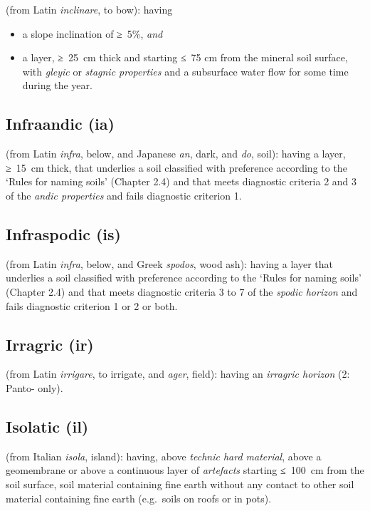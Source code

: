 \documentclass[
  letterpaper,
  DIV=11,
  numbers=noendperiod]{scrreprt}
\providecommand{\tightlist}{%
  \setlength{\itemsep}{0pt}\setlength{\parskip}{0pt}}\usepackage{longtable,booktabs,array}
\begin{document}
(from Latin \emph{inclinare}, to bow): having

\begin{itemize}
\tightlist
\item
  a slope inclination of ≥~5\%, \emph{and}
\item
  a layer, ≥~25~cm thick and starting ≤~75 cm from the mineral soil
  surface, with \emph{gleyic} or \emph{stagnic properties} and a
  subsurface water flow for some time during the year.
\end{itemize}

\hypertarget{infraandic-ia}{%
\subsection{Infraandic (ia)}\label{infraandic-ia}}

(from Latin \emph{infra}, below, and Japanese \emph{an}, dark, and
\emph{do}, soil): having a layer, ≥~15~cm thick, that underlies a soil
classified with preference according to the `Rules for naming soils'
(Chapter 2.4) and that meets diagnostic criteria 2 and 3 of the
\emph{andic properties} and fails diagnostic criterion 1.

\hypertarget{infraspodic-is}{%
\subsection{Infraspodic (is)}\label{infraspodic-is}}

(from Latin \emph{infra}, below, and Greek \emph{spodos}, wood ash):
having a layer that underlies a soil classified with preference
according to the `Rules for naming soils' (Chapter 2.4) and that meets
diagnostic criteria 3 to 7 of the \emph{spodic horizon} and fails
diagnostic criterion 1 or 2 or both.

\hypertarget{irragric-ir}{%
\subsection{Irragric (ir)}\label{irragric-ir}}

(from Latin \emph{irrigare}, to irrigate, and \emph{ager}, field):
having an \emph{irragric horizon} (2: Panto- only).

\hypertarget{isolatic-il}{%
\subsection{Isolatic (il)}\label{isolatic-il}}

(from Italian \emph{isola}, island): having, above \emph{technic hard
material}, above a geomembrane or above a continuous layer of
\emph{artefacts} starting ≤~100~cm from the soil surface, soil material
containing fine earth without any contact to other soil material
containing fine earth (e.g.~soils on roofs or in pots).
\end{document}
